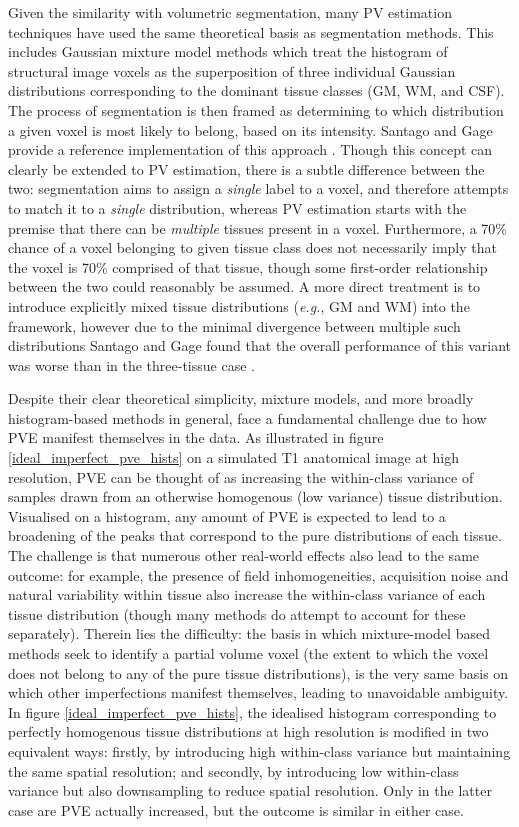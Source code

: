 \documentclass[12pt]{report}
\begin{document}
Given the similarity with volumetric segmentation, many PV estimation techniques have used the same theoretical basis as segmentation methods. This includes Gaussian mixture model methods which treat the histogram of structural image voxels as the superposition of three individual Gaussian distributions corresponding to the dominant tissue classes (GM, WM, and CSF). The process of segmentation is then framed as determining to which distribution a given voxel is most likely to belong, based on its intensity. Santago and Gage provide a reference implementation of this approach \cite{Santago1993}. Though this concept can clearly be extended to PV estimation, there is a subtle difference between the two: segmentation aims to assign a \textit{single} label to a voxel, and therefore attempts to match it to a \textit{single} distribution, whereas PV estimation starts with the premise that there can be \textit{multiple} tissues present in a voxel. Furthermore, a 70\% chance of a voxel belonging to given tissue class does not necessarily imply that the voxel is 70\% comprised of that tissue, though some first-order relationship between the two could reasonably be assumed. A more direct treatment is to introduce explicitly mixed tissue distributions (\textit{e.g.}, GM and WM) into the framework, however due to the minimal divergence between multiple such distributions Santago and Gage found that the overall performance of this variant was worse than in the three-tissue case \cite{Santago1993}.

Despite their clear theoretical simplicity, mixture models, and more broadly histogram-based methods in general, face a fundamental challenge due to how PVE manifest themselves in the data. As illustrated in figure \ref{ideal_imperfect_pve_hists} on a simulated T1 anatomical image at high resolution, PVE can be thought of as increasing the within-class variance of samples drawn from an otherwise homogenous (low variance) tissue distribution. Visualised on a histogram, any amount of PVE is expected to lead to a broadening of the peaks that correspond to the pure distributions of each tissue. The challenge is that numerous other real-world effects also lead to the same outcome: for example, the presence of field inhomogeneities, acquisition noise and natural variability within tissue also increase the within-class variance of each tissue distribution (though many methods do attempt to account for these separately). Therein lies the difficulty: the basis in which mixture-model based methods seek to identify a partial volume voxel (the extent to which the voxel does not belong to any of the pure tissue distributions), is the very same basis on which other imperfections manifest themselves, leading to unavoidable ambiguity. In figure \ref{ideal_imperfect_pve_hists}, the idealised histogram corresponding to perfectly homogenous tissue distributions at high resolution is modified in two equivalent ways: firstly, by introducing high within-class variance but maintaining the same spatial resolution; and secondly, by introducing low within-class variance but also downsampling to reduce spatial resolution. Only in the latter case are PVE actually increased, but the outcome is similar in either case. 
\end{document}
